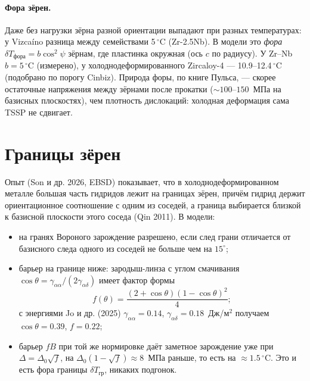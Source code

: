 \paragraph{Фора зёрен.} Даже без нагрузки зёрна разной ориентации выпадают при разных температурах:
у Vizcaíno разница между семействами 5\,$^\circ$C (Zr-2.5Nb). В модели это \emph{фора}
$\delta T_{\text{фора}}=b\cos^2\psi$ зёрнам, где пластинка окружная (ось $c$ по радиусу).
У Zr--Nb $b=5\,^\circ$C (измерено), у холоднодеформированного Zircaloy-4 --- 10.9--12.4\,$^\circ$C
(подобрано по порогу Cinbiz). Природа форы, по книге Пульса, --- скорее остаточные напряжения между
зёрнами после прокатки ($\sim100$--$150$~МПа на базисных плоскостях), чем плотность дислокаций:
холодная деформация сама TSSP не сдвигает.

\section{Границы зёрен}


Опыт (Son и др. 2026, EBSD) показывает, что в холоднодеформированном металле большая часть
гидридов лежит на границах зёрен, причём гидрид держит ориентационное соотношение с одним из
соседей, а граница выбирается близкой к базисной плоскости этого соседа (Qin 2011). В модели:
\begin{itemize}
\item на гранях Вороного зарождение разрешено, если след грани отличается от базисного следа
  одного из соседей не больше чем на $15^\circ$;
\item барьер на границе ниже: зародыш-линза с углом смачивания
  $\cos\theta=\gamma_{\alpha\alpha}/(2\gamma_{\alpha\delta})$ имеет фактор формы
  \begin{equation}
  f(\theta)=\frac{(2+\cos\theta)(1-\cos\theta)^2}{4};
  \end{equation}
  с энергиями Jo и др. (2025) $\gamma_{\alpha\alpha}=0.14$, $\gamma_{\alpha\delta}=0.18$~Дж/м$^2$
  получаем $\cos\theta=0.39$, $f=0.22$;
\item барьер $fB$ при той же нормировке даёт заметное зарождение уже при $\Delta=\Delta_0\sqrt f$,
  на $\Delta_0(1-\sqrt f)\approx8$~МПа раньше, то есть на $\approx1.5\,^\circ$C. Это и есть фора
  границы $\delta T_{\text{гр}}$, никаких подгонок.
\end{itemize}

